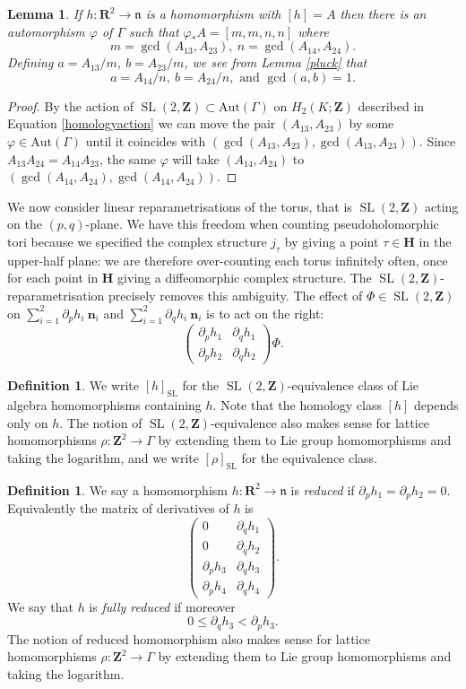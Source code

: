 \documentclass[11pt]{amsart}
\newcommand{\HH}{\mathbf{H}}
\newcommand{\RR}{\mathbf{R}}
\newcommand{\ZZ}{\mathbf{Z}}
\newcommand{\Aut}{\mathrm{Aut}}
\newcommand{\nn}{\mathfrak{n}}
\renewcommand{\phi}{\varphi}
\newcommand{\OP}{\operatorname}
\numberwithin{equation}{section}
\newtheorem{lma}[equation]{Lemma}
\theoremstyle{definition}
\newtheorem{dfn}[equation]{Definition}
\theoremstyle{remark}
\begin{document}
\begin{lma}\label{wlog}
If $h\colon\RR^2\to\nn$ is a homomorphism with $[h]=A$ then there is an automorphism $\phi$ of $\Gamma$ such that $\phi_*A=[m,m,n,n]$ where
\[m=\gcd(A_{13},A_{23}),\ n=\gcd(A_{14},A_{24}).\]
Defining $a=A_{13}/m$, $b=A_{23}/m$, we see from Lemma \ref{pluck} that
\[a=A_{14}/n,\ b=A_{24}/n,\mbox{ and }\gcd(a,b)=1.\]
\end{lma}
\begin{proof}
By the action of $\OP{SL}(2,\ZZ)\subset\Aut(\Gamma)$ on $H_2(K;\ZZ)$ described in Equation \eqref{homologyaction} we can move the pair $(A_{13},A_{23})$ by some $\phi\in\Aut(\Gamma)$ until it coincides with $(\gcd(A_{13},A_{23}),\gcd(A_{13},A_{23}))$. Since $A_{13}A_{24}=A_{14}A_{23}$, the same $\phi$ will take $(A_{14},A_{24})$ to $(\gcd(A_{14},A_{24}),\gcd(A_{14},A_{24}))$.
\end{proof}
We now consider linear reparametrisations of the torus, that is $\OP{SL}(2,\ZZ)$ acting on the $(p,q)$-plane. We have this freedom when counting pseudoholomorphic tori because we specified the complex structure $j_{\tau}$ by giving a point $\tau\in\HH$ in the upper-half plane: we are therefore over-counting each torus infinitely often, once for each point in $\HH$ giving a diffeomorphic complex structure. The $\OP{SL}(2,\ZZ)$-reparametrisation precisely removes this ambiguity. The effect of $\Phi\in\OP{SL}(2,\ZZ)$ on $\sum_{i=1}^2\partial_ph_i\ \mathbf{n}_i$ and $\sum_{i=1}^2\partial_qh_i\ \mathbf{n}_i$ is to act on the right:
\[\left(\begin{array}{cc}
\partial_ph_1 & \partial_qh_1\\
\partial_ph_2 & \partial_qh_2
\end{array}\right)\Phi.\]

\begin{dfn}
We write $[h]_{\OP{SL}}$ for the $\OP{SL}(2,\ZZ)$-equivalence class of Lie algebra homomorphisms containing $h$. Note that the homology class $[h]$ depends only on $h$. The notion of $\OP{SL}(2,\ZZ)$-equivalence also makes sense for lattice homomorphisms $\rho\colon\ZZ^2\to\Gamma$ by extending them to Lie group homomorphisms and taking the logarithm, and we write $[\rho]_{\OP{SL}}$ for the equivalence class.
\end{dfn}

\begin{dfn}\label{reddfn}
We say a homomorphism $h\colon\RR^2\to\nn$ is {\em reduced} if $\partial_ph_1=\partial_ph_2=0$. Equivalently the matrix of derivatives of $h$ is
\[
\left(\begin{array}{cc}
0 & \partial_qh_1\\
0 & \partial_qh_2\\
\partial_ph_3 & \partial_qh_3\\
\partial_ph_4 & \partial_qh_4
\end{array}\right).
\]
We say that $h$ is \emph{fully reduced} if moreover
\[0\leq\partial_qh_3 <\partial_ph_3.\]
The notion of reduced homomorphism also makes sense for lattice homomorphisms $\rho\colon\ZZ^2\to\Gamma$ by extending them to Lie group homomorphisms and taking the logarithm.
\end{dfn}
\end{document}
